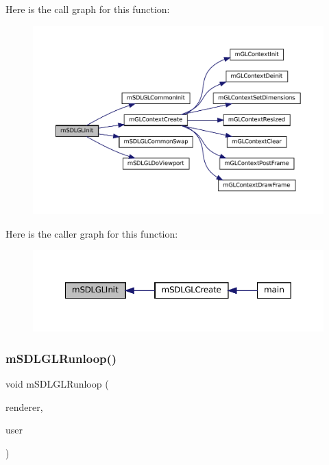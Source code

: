 Here is the call graph for this function\+:
\nopagebreak
\begin{figure}[H]
\begin{center}
\leavevmode
\includegraphics[width=350pt]{gl-sdl_8c_a59b282969b17f19eff20d0fa9946867a_cgraph}
\end{center}
\end{figure}
Here is the caller graph for this function\+:
\nopagebreak
\begin{figure}[H]
\begin{center}
\leavevmode
\includegraphics[width=350pt]{gl-sdl_8c_a59b282969b17f19eff20d0fa9946867a_icgraph}
\end{center}
\end{figure}
\mbox{\label{gl-sdl_8c_afe005d63d3605a9049c0aa730ad071b4}} 
\subsubsection{\texorpdfstring{m\+S\+D\+L\+G\+L\+Runloop()}{mSDLGLRunloop()}}
{\footnotesize\ttfamily void m\+S\+D\+L\+G\+L\+Runloop (\begin{DoxyParamCaption}\item[{struct \mbox{\hyperlink{structm_s_d_l_renderer}{m\+S\+D\+L\+Renderer}} $\ast$}]{renderer,  }\item[{void $\ast$}]{user }\end{DoxyParamCaption})\hspace{0.3cm}{\ttfamily [static]}}

